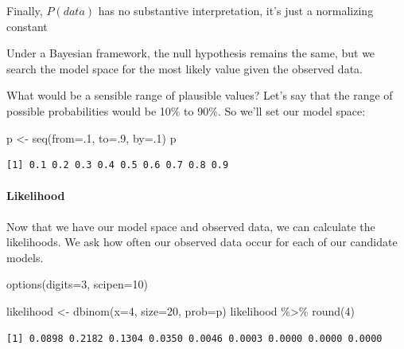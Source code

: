 \documentclass[
  letterpaper,
  DIV=11,
  numbers=noendperiod,
  oneside]{scrartcl}
\let\oldparagraph\paragraph
\renewcommand{\paragraph}[1]{\oldparagraph{#1}\mbox{}}
\newenvironment{Shaded}{\begin{snugshade}}{\end{snugshade}}
\newcommand{\AttributeTok}[1]{\textcolor[rgb]{0.40,0.45,0.13}{#1}}
\newcommand{\DecValTok}[1]{\textcolor[rgb]{0.68,0.00,0.00}{#1}}
\newcommand{\FunctionTok}[1]{\textcolor[rgb]{0.28,0.35,0.67}{#1}}
\newcommand{\NormalTok}[1]{\textcolor[rgb]{0.00,0.23,0.31}{#1}}
\newcommand{\OtherTok}[1]{\textcolor[rgb]{0.00,0.23,0.31}{#1}}
\newcommand{\SpecialCharTok}[1]{\textcolor[rgb]{0.37,0.37,0.37}{#1}}
\begin{document}
Finally, \(P(data)\) has no substantive interpretation, it's just a
normalizing constant

Under a Bayesian framework, the null hypothesis remains the same, but we
search the model space for the most likely value given the observed
data.

What would be a sensible range of plausible values? Let's say that the
range of possible probabilities would be 10\% to 90\%. So we'll set our
model space:

\begin{Shaded}
\begin{Highlighting}[]
\NormalTok{p }\OtherTok{\textless{}{-}} \FunctionTok{seq}\NormalTok{(}\AttributeTok{from=}\NormalTok{.}\DecValTok{1}\NormalTok{,}
         \AttributeTok{to=}\NormalTok{.}\DecValTok{9}\NormalTok{,}
         \AttributeTok{by=}\NormalTok{.}\DecValTok{1}\NormalTok{)}
\NormalTok{p}
\end{Highlighting}
\end{Shaded}

\begin{verbatim}
[1] 0.1 0.2 0.3 0.4 0.5 0.6 0.7 0.8 0.9
\end{verbatim}

\hypertarget{likelihood}{%
\paragraph{Likelihood}\label{likelihood}}

Now that we have our model space and observed data, we can calculate the
likelihoods. We ask how often our observed data occur for each of our
candidate models.

\begin{Shaded}
\begin{Highlighting}[]
\FunctionTok{options}\NormalTok{(}\AttributeTok{digits=}\DecValTok{3}\NormalTok{, }\AttributeTok{scipen=}\DecValTok{10}\NormalTok{)}

\NormalTok{likelihood }\OtherTok{\textless{}{-}} \FunctionTok{dbinom}\NormalTok{(}\AttributeTok{x=}\DecValTok{4}\NormalTok{,}
                     \AttributeTok{size=}\DecValTok{20}\NormalTok{,}
                     \AttributeTok{prob=}\NormalTok{p)}
\NormalTok{likelihood }\SpecialCharTok{\%\textgreater{}\%}
  \FunctionTok{round}\NormalTok{(}\DecValTok{4}\NormalTok{)}
\end{Highlighting}
\end{Shaded}

\begin{verbatim}
[1] 0.0898 0.2182 0.1304 0.0350 0.0046 0.0003 0.0000 0.0000 0.0000
\end{verbatim}
\end{document}
